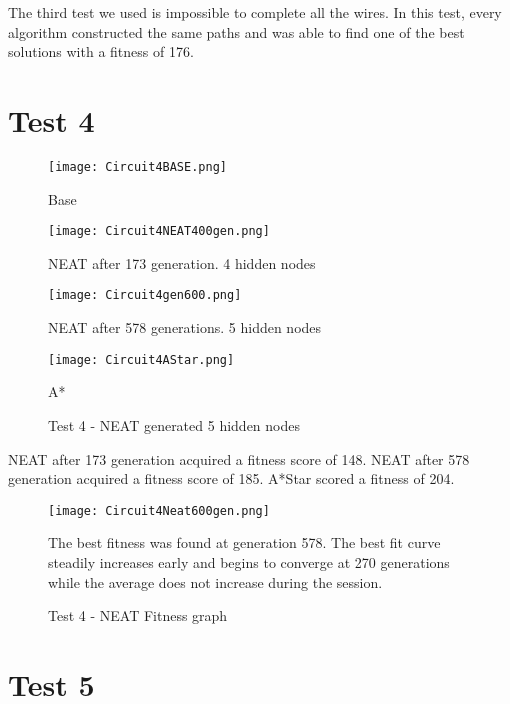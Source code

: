\documentclass{kththesis}
\begin{document}
The third test we used is impossible to complete all the wires. In this test, every algorithm constructed the same paths and was able to find one of the best solutions with a fitness of 176.

\section{Test 4}

\begin{figure}[h]
{\centering

\begin{minipage}{0.45\textwidth}
\centering
\texttt{[image: Circuit4BASE.png]}
\caption{Base}
\end{minipage}\hfill
\begin{minipage}{0.45\textwidth}
\centering
\texttt{[image: Circuit4NEAT400gen.png]}
\caption{NEAT after 173 generation. 4 hidden nodes}
\end{minipage}\hfill

\begin{minipage}{0.45\textwidth}
\centering
\texttt{[image: Circuit4gen600.png]}
\caption{NEAT after 578 generations. 5 hidden nodes}
\end{minipage}\hfill
\begin{minipage}{0.45\textwidth}
\centering
\texttt{[image: Circuit4AStar.png]}
\caption{A*}
\end{minipage}\hfill
\caption{Test 4 - NEAT generated 5 hidden nodes}
\label{Test 4}
}

\end{figure}

NEAT after 173 generation acquired a fitness score of 148. NEAT after 578 generation acquired a fitness score of 185. A*Star scored a fitness of 204.

\begin{figure}[h]
{\centering
\begin{minipage}{1\textwidth}
\centering
\texttt{[image: Circuit4Neat600gen.png]}
\end{minipage}\hfill
\caption{Test 4 - NEAT Fitness graph}
}
The best fitness was found at generation 578. The best fit curve steadily increases early and begins to converge at 270 generations while the average does not increase during the session. 
\end{figure}

\newpage

\section{Test 5}
\end{document}
